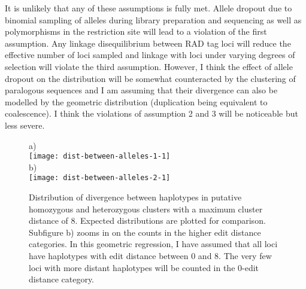 \documentclass{article}\usepackage[]{graphicx}\usepackage[]{color}
\begin{document}
It is unlikely that any of these assumptions is fully met. Allele dropout due to binomial sampling of alleles during library preparation and sequencing as well as polymorphisms in the restriction site will lead to a violation of the first assumption. Any linkage disequilibrium between RAD tag loci will reduce the effective number of loci sampled and linkage with  loci under varying degrees of selection will violate the third assumption. However, I think the effect of allele dropout on the distribution will be somewhat counteracted by the clustering of paralogous sequences and I am assuming that their divergence can also be modelled by the geometric distribution (duplication being equivalent to coalescence). I think the violations of assumption 2 and 3 will be noticeable but less severe.

\begin{figure}
\large
\centering
\hspace{-400pt}a)\\
\texttt{[image: dist-between-alleles-1-1]}
\vspace{20pt}\\
\hspace{-400pt}b)\\
\texttt{[image: dist-between-alleles-2-1]}
\caption{Distribution of divergence between haplotypes in putative homozygous and heterozygous clusters with a maximum cluster distance of 8. Expected distributions are plotted for comparison. Subfigure b) zooms in on the counts in the higher edit distance categories. In this geometric regression, I have assumed that all loci have haplotypes with edit distance between 0 and 8. The very few loci with more distant haplotypes will be counted in the 0-edit distance category.}
\label{Fig:dist-between-alleles}
\end{figure}
\end{document}
